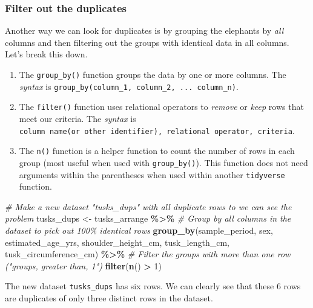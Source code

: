 \documentclass[
]{article}
\newenvironment{Shaded}{\begin{snugshade}}{\end{snugshade}}
\newcommand{\CommentTok}[1]{\textcolor[rgb]{0.56,0.35,0.01}{\textit{#1}}}
\newcommand{\DecValTok}[1]{\textcolor[rgb]{0.00,0.00,0.81}{#1}}
\newcommand{\FunctionTok}[1]{\textcolor[rgb]{0.13,0.29,0.53}{\textbf{#1}}}
\newcommand{\NormalTok}[1]{#1}
\newcommand{\OtherTok}[1]{\textcolor[rgb]{0.56,0.35,0.01}{#1}}
\newcommand{\SpecialCharTok}[1]{\textcolor[rgb]{0.81,0.36,0.00}{\textbf{#1}}}
\providecommand{\tightlist}{%
  \setlength{\itemsep}{0pt}\setlength{\parskip}{0pt}}
\begin{document}
\subsubsection{Filter out the
duplicates}\label{filter-out-the-duplicates}

Another way we can look for duplicates is by grouping the elephants by
\emph{all} columns and then filtering out the groups with identical data
in all columns. Let's break this down.

\begin{enumerate}
\def\labelenumi{\arabic{enumi}.}
\tightlist
\item
  The \texttt{group\_by()} function groups the data by one or more
  columns. The \emph{syntax} is
  \texttt{group\_by(column\_1,\ column\_2,\ ...\ column\_n)}.
\item
  The \texttt{filter()} function uses relational operators to
  \emph{remove} or \emph{keep} rows that meet our criteria. The
  \emph{syntax} is
  \texttt{column\ name(or\ other\ identifier),\ relational\ operator,\ criteria}.
\item
  The \texttt{n()} function is a helper function to count the number of
  rows in each group (most useful when used with \texttt{group\_by()}).
  This function does not need arguments within the parentheses when used
  within another \texttt{tidyverse} function.
\end{enumerate}

\begin{Shaded}
\begin{Highlighting}[]
\CommentTok{\# Make a new dataset "tusks\_dups" with all duplicate rows to we can see the problem}
\NormalTok{tusks\_dups }\OtherTok{\textless{}{-}}\NormalTok{ tusks\_arrange }\SpecialCharTok{\%\textgreater{}\%}
  \CommentTok{\# Group by all columns in the dataset to pick out 100\% identical rows}
  \FunctionTok{group\_by}\NormalTok{(sample\_period, }
\NormalTok{           sex, }
\NormalTok{           estimated\_age\_yrs, }
\NormalTok{           shoulder\_height\_cm, }
\NormalTok{           tusk\_length\_cm, }
\NormalTok{           tusk\_circumference\_cm) }\SpecialCharTok{\%\textgreater{}\%}
  \CommentTok{\# Filter the groups with more than one row ("groups, greater than, 1")}
  \FunctionTok{filter}\NormalTok{(}\FunctionTok{n}\NormalTok{() }\SpecialCharTok{\textgreater{}} \DecValTok{1}\NormalTok{)}
\end{Highlighting}
\end{Shaded}

The new dataset \texttt{tusks\_dups} has six rows. We can clearly see
that these 6 rows are duplicates of only three distinct rows in the
dataset.
\end{document}
